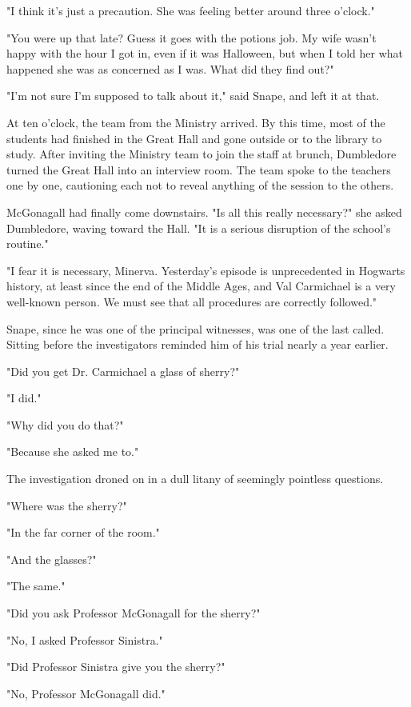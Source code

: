 \documentclass[a4paper,11pt]{article}
\begin{document}
"I think it's just a precaution. She was feeling better around three o'clock."

"You were up that late? Guess it goes with the potions job. My wife wasn't happy with the hour I got in, even if it was Halloween, but when I told her what happened she was as concerned as I was. What did they find out?"

"I'm not sure I'm supposed to talk about it," said Snape, and left it at that.

At ten o'clock, the team from the Ministry arrived. By this time, most of the students had finished in the Great Hall and gone outside or to the library to study. After inviting the Ministry team to join the staff at brunch, Dumbledore turned the Great Hall into an interview room. The team spoke to the teachers one by one, cautioning each not to reveal anything of the session to the others.

McGonagall had finally come downstairs. "Is all this really necessary?" she asked Dumbledore, waving toward the Hall. "It is a serious disruption of the school's routine."

"I fear it is necessary, Minerva. Yesterday's episode is unprecedented in Hogwarts history, at least since the end of the Middle Ages, and Val Carmichael is a very well-known person. We must see that all procedures are correctly followed."

Snape, since he was one of the principal witnesses, was one of the last called. Sitting before the investigators reminded him of his trial nearly a year earlier.

"Did you get Dr. Carmichael a glass of sherry?"

"I did."

"Why did you do that?"

"Because she asked me to."

The investigation droned on in a dull litany of seemingly pointless questions.

"Where was the sherry?"

"In the far corner of the room."

"And the glasses?"

"The same."

"Did you ask Professor McGonagall for the sherry?"

"No, I asked Professor Sinistra."

"Did Professor Sinistra give you the sherry?"

"No, Professor McGonagall did."
\end{document}
